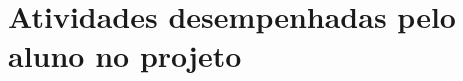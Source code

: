 \section[Atividades desempenhadas pelo aluno no projeto]{Atividades desempenhadas pelo aluno no projeto}










